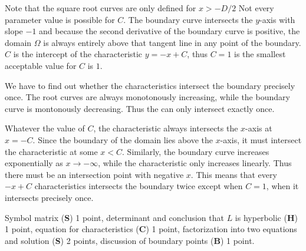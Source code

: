 \begin{loesung}
\begin{teilaufgaben}
Note that the square root curves are only defined for $x>-D/2$
Not every parameter value is possible for $C$.
The boundary curve intersects the $y$-axis with slope $-1$ and
because the second derivative of the boundary curve is positive,
the domain $\Omega$ is always entirely above that tangent line in
any point of the boundary.
$C$ is the intercept of the characteristic $y=-x+C$, thus $C=1$ is
the smallest acceptable value for $C$ is $1$.

We have to find out whether the characteristics intersect the boundary 
precisely once.
The root curves are always monotonously increasing, while the boundary
curve is montonously decreasing.
Thus the can only intersect exactly once.

Whatever the value of $C$, the characteristic always intersects
the $x$-axis at $x=-C$.
Since the boundary of the domain lies above the $x$-axis, it must
intersect the characteristic at some $x<C$.
Similarly, the boundary curve increases exponentially as $x\to-\infty$,
while the characteristic only increases linearly.
Thus there must be an intersection point with negative $x$.
This means that every $-x+C$ characteristics intersects the boundary
twice except when $C=1$, when it intersects precisely once.
\qedhere
\end{teilaufgaben}
\end{loesung}

\begin{bewertung}
Symbol matrix ({\bf S}) 1 point,
determinant and conclusion that $L$ is hyperbolic ({\bf H}) 1 point,
equation for characteristics ({\bf C}) 1 point,
factorization into two equations and solution ({\bf S}) 2 points,
discussion of boundary points ({\bf B}) 1 point.
\end{bewertung}

